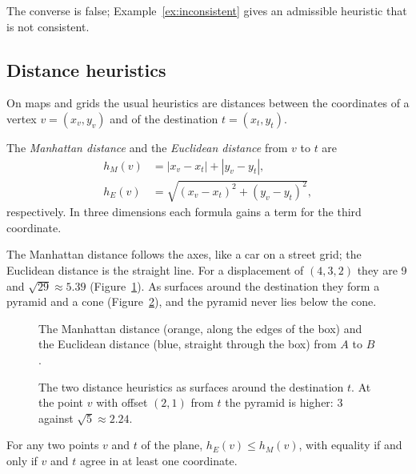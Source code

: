 The converse is false; Example~\ref{ex:inconsistent} gives an admissible
heuristic that is not consistent.

\subsection{Distance heuristics}\label{sec:distance-h}

On maps and grids the usual heuristics are distances between the coordinates
of a vertex $v = (x_v, y_v)$ and of the destination $t = (x_t, y_t)$.

\begin{definition}\label{def:distances}
The \emph{Manhattan distance} and the \emph{Euclidean distance} from $v$ to $t$
are
\begin{align}
  h_{M}(v) &= |x_v - x_t| + |y_v - y_t|, \label{eq:manhattan}\\
  h_{E}(v) &= \sqrt{(x_v - x_t)^2 + (y_v - y_t)^2}, \label{eq:euclidean}
\end{align}
respectively. In three dimensions each formula gains a term for the third
coordinate.
\end{definition}

The Manhattan distance follows the axes, like a car on a street grid; the
Euclidean distance is the straight line. For a displacement of $(4, 3, 2)$ they
are 9 and $\sqrt{29} \approx 5.39$ (Figure~\ref{fig:euclid-box}). As surfaces
around the destination they form a pyramid and a cone
(Figure~\ref{fig:cone-pyramid}), and the pyramid never lies below the cone.

\begin{figure}[htbp]
  \centering
  
  \caption{The Manhattan distance (orange, along the edges of the box) and the
    Euclidean distance (blue, straight through the box) from $A$ to
    $B$.}\label{fig:euclid-box}
\end{figure}

\begin{figure}[htbp]
  \centering
  
  \caption{The two distance heuristics as surfaces around the destination $t$. At the
    point $v$ with offset $(2,1)$ from $t$ the pyramid is higher: 3 against
    $\sqrt{5} \approx 2.24$.}\label{fig:cone-pyramid}
\end{figure}

\begin{proposition}\label{prop:manh-eucl}
For any two points $v$ and $t$ of the plane, $h_{E}(v) \le h_{M}(v)$, with
equality if and only if $v$ and $t$ agree in at least one coordinate.
\end{proposition}

